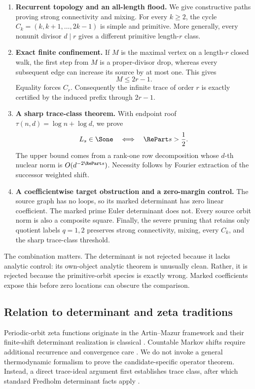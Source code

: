 \begin{enumerate}
  \item \textbf{Recurrent topology and an all-length flood.}
  We give constructive paths proving strong connectivity and mixing.  For
  every \(k\ge2\), the cycle
  \(C_k=(k,k+1,\ldots,2k-1)\) is simple and primitive.  More generally, every
  nonunit divisor \(d\mid r\) gives a different primitive length-\(r\) class.

  \item \textbf{Exact finite confinement.}
  If \(M\) is the maximal vertex on a length-\(r\) closed walk, the first
  step from \(M\) is a proper-divisor drop, whereas every subsequent edge can
  increase its source by at most one.  This gives
  \[
  M\le2r-1.
  \]
  Equality forces \(C_r\).  Consequently the infinite trace of order \(r\)
  is exactly certified by the induced prefix through \(2r-1\).

  \item \textbf{A sharp trace-class theorem.}
  With endpoint roof \(\tau(n,d)=\log n+\log d\), we prove
  \[
  L_s\in\Sone\quad\Longleftrightarrow\quad\RePart s>\frac12.
  \]
  The upper bound comes from a rank-one row decomposition whose \(d\)-th
  nuclear norm is \(O(d^{-2\RePart s})\).  Necessity follows by Fourier
  extraction of the successor weighted shift.

  \item \textbf{A coefficientwise target obstruction and a zero-margin
  control.}
  The source graph has no loops, so its marked determinant has zero linear
  coefficient.  The marked prime Euler determinant does not.  Every source
  orbit norm is also a composite square.  Finally, the severe pruning that
  retains only quotient labels \(q=1,2\) preserves strong connectivity,
  mixing, every \(C_k\), and the sharp trace-class threshold.
\end{enumerate}

The combination matters.  The determinant is not rejected because it lacks
analytic control: its own-object analytic theorem is unusually clean.
Rather, it is rejected because the primitive-orbit species is exactly wrong.
Marked coefficients expose this before zero locations can obscure the
comparison.

\subsection{Relation to determinant and zeta traditions}

Periodic-orbit zeta functions originate in the Artin--Mazur framework and
their finite-shift determinant realization is classical
\citep{ArtinMazur1965,BowenLanford1970}.  Countable Markov shifts require
additional recurrence and convergence care
\citep{GurevichSavchenko1998,Sarig1999}.  We do not invoke a general
thermodynamic formalism to prove the candidate-specific operator theorem.
Instead, a direct trace-ideal argument first establishes trace class, after
which standard Fredholm determinant facts apply \citep{Simon1977}.

